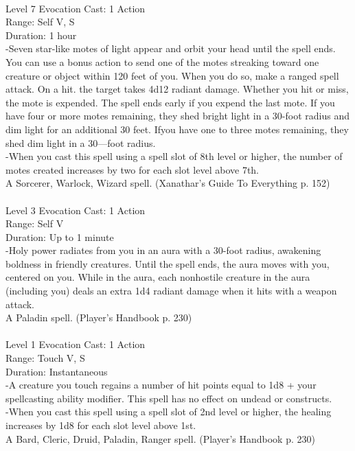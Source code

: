 \documentclass[10pt,twocolumn]{report}
\begin{document}
 \\
Level 7 \quad Evocation \quad Cast: 1 Action\\
Range: Self \quad V, S\\
Duration: 1 hour \quad \\
-Seven star-like motes of light appear and orbit your head until the spell ends. You can use a bonus action to send one of the motes streaking toward one creature or object within 120 feet of you. When you do so, make a ranged spell attack. On a hit. the target takes 4d12 radiant damage. Whether you hit or miss, the mote is expended. The spell ends early if you expend the last mote. If you have four or more motes remaining, they shed bright light in a 30-foot radius and dim light for an additional 30 feet. Ifyou have one to three motes remaining, they shed dim light in a 30—foot radius.\\
-When you cast this spell using a spell slot of 8th level or higher, the number of motes created increases by two for each slot level above 7th.\\
A Sorcerer, Warlock, Wizard spell. (Xanathar's Guide To Everything p. 152) \\


 \\
Level 3 \quad Evocation \quad Cast: 1 Action\\
Range: Self \quad V\\
Duration: Up to 1 minute \quad \\
-Holy power radiates from you in an aura with a 30-foot radius, awakening boldness in friendly creatures. Until the spell ends, the aura moves with you, centered on you. While in the aura, each nonhostile creature in the aura (including you) deals an extra 1d4 radiant damage when it hits with a weapon attack.\\
A Paladin spell. (Player's Handbook p. 230) \\


 \\
Level 1 \quad Evocation \quad Cast: 1 Action\\
Range: Touch \quad V, S\\
Duration: Instantaneous \quad \\
-A creature you touch regains a number of hit points equal to 1d8 + your spellcasting ability modifier. This spell has no effect on undead or constructs.\\
-When you cast this spell using a spell slot of 2nd level or higher, the healing increases by 1d8 for each slot level above 1st.\\
A Bard, Cleric, Druid, Paladin, Ranger spell. (Player's Handbook p. 230) \\
\end{document}
